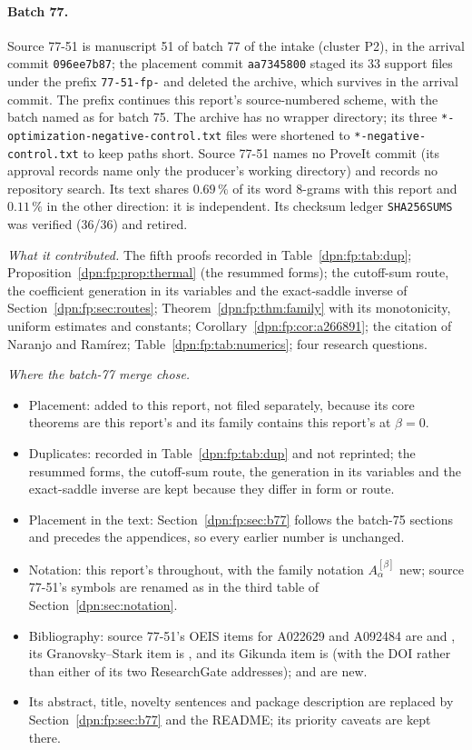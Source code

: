 \documentclass[11pt]{article}
\numberwithin{equation}{section}
\theoremstyle{definition}\newtheorem{definition}[theorem]{Definition}
\theoremstyle{remark}\newtheorem{remark}[theorem]{Remark}
\newcommand{\file}[1]{\nolinkurl{#1}}
\begin{document}
\paragraph{Batch 77.}
Source 77-51 is manuscript 51 of batch 77 of the intake (cluster P2), in the
arrival commit \texttt{096ee7b87}; the placement commit \texttt{aa7345800}
staged its 33 support files under the prefix \file{77-51-fp-} and deleted the
archive, which survives in the arrival commit.  The prefix continues this
report's source-numbered scheme, with the batch named as for batch 75.  The
archive has no wrapper directory; its three
\file{*-optimization-negative-control.txt} files were shortened to
\file{*-negative-control.txt} to keep paths short.  Source 77-51 names no
ProveIt commit (its approval records name only the producer's working
directory) and records no repository search.  Its text shares $0.69\,\%$ of
its word 8-grams with this report and $0.11\,\%$ in the other direction: it is
independent.  Its checksum ledger \file{SHA256SUMS} was verified (36/36) and
retired.

\emph{What it contributed.}  The fifth proofs recorded in
Table~\ref{dpn:fp:tab:dup}; Proposition~\ref{dpn:fp:prop:thermal} (the
resummed forms); the cutoff-sum route, the coefficient generation in its
variables and the exact-saddle inverse of Section~\ref{dpn:fp:sec:routes};
Theorem~\ref{dpn:fp:thm:family} with its monotonicity, uniform estimates and
constants; Corollary~\ref{dpn:fp:cor:a266891}; the citation of Naranjo and
Ram\'irez; Table~\ref{dpn:fp:tab:numerics}; four research questions.

\emph{Where the batch-77 merge chose.}
\begin{itemize}
\item Placement: added to this report, not filed separately, because its
      core theorems are this report's and its family contains this report's
      at $\beta=0$.
\item Duplicates: recorded in Table~\ref{dpn:fp:tab:dup} and not reprinted;
      the resummed forms, the cutoff-sum route, the generation in its
      variables and the exact-saddle inverse are kept because they differ in
      form or route.
\item Placement in the text: Section~\ref{dpn:fp:sec:b77} follows the
      batch-75 sections and precedes the appendices, so every earlier
      number is unchanged.
\item Notation: this report's throughout, with the family notation
      $A^{[\beta]}_\alpha$ new; source 77-51's symbols are renamed as in the
      third table of Section~\ref{dpn:sec:notation}.
\item Bibliography: source 77-51's OEIS items for A022629 and A092484 are
      \cite{oeis1} and \cite{oeis2}, its Granovsky--Stark item is \cite{GS},
      and its Gikunda item is \cite{gikunda} (with the DOI rather than either
      of its two ResearchGate addresses); \cite{NR} and \cite{oeis266891} are
      new.
\item Its abstract, title, novelty sentences and package description are
      replaced by Section~\ref{dpn:fp:sec:b77} and the README; its priority
      caveats are kept there.
\end{itemize}
\end{document}
